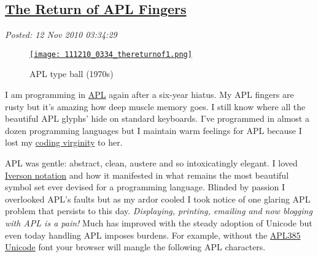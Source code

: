 %

\subsection*{\href{http://bakerjd99.wordpress.com/2010/11/12/the-return-of-apl-fingers-2/}{The Return of APL Fingers}}


\noindent\emph{Posted: 12 Nov 2010 03:34:29}
\vspace{6pt}



\begin{figure}
\centering
\href{http://blogs.mysql.com/kaj/2009/01/20/seven-useless-facts/}{\texttt{[image: 111210\_0334\_thereturnof1.png]}}
\caption{APL type ball (1970s)}
\label{fig:835X0}
\end{figure}

I am programming in
\href{http://en.wikipedia.org/wiki/APL\_(programming\_language)}{APL}
again after a six-year hiatus. My APL fingers are rusty but it's amazing
how deep muscle memory goes. I still know where all the beautiful APL
glyphs' hide on standard keyboards. I've programmed in almost a dozen
programming languages but I maintain warm feelings for APL because I
lost my
\href{http://www.codesqueeze.com/the-ultimate-top-25-chuck-norris-the-programmer-jokes/}{coding
virginity} to her.

APL was gentle: abstract, clean, austere and so intoxicatingly elegant.
I loved \href{http://en.wikipedia.org/wiki/Kenneth\_E.\_Iverson}{Iverson
notation} and how it manifested in what remains the most beautiful
symbol set ever devised for a programming language. Blinded by passion I
overlooked APL's faults but as my ardor cooled I took notice of one
glaring APL problem that persists to this day. \emph{Displaying,
printing, emailing and now blogging with APL is a pain!} Much has
improved with the steady adoption of Unicode but even today handling APL
imposes burdens. For example, without the
\href{http://www.vector.org.uk/?area=fonts}{APL385 Unicode} font your
browser will mangle the following APL characters.

